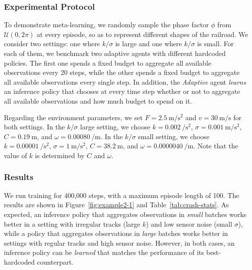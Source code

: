 \subsubsection{Experimental Protocol} To demonstrate meta-learning, we randomly sample the phase factor $\phi$ from $\mathcal{U}(0, 2\pi)$ at every episode, so as to represent different shapes of the railroad. We consider two settings: one where $k/\sigma$ is large and one where $k/\sigma$ is small. For each of them, we benchmark two adaptive agents with different hardcoded policies. The first one spends a fixed budget to aggregate all available observations every 20 steps, while the other spends a fixed budget to aggregate all available observations every single step. In addition, the \emph{Adaptive} agent \emph{learns} an inference policy that chooses at every time step whether or not to aggregate all available observations and how much budget to spend on it.

Regarding the environment parameters, we set $F=\qty{2.5}{\meter\per\second\squared}$ and $v=\qty{30}{\meter\per\second}$ for both settings. In the $k/\sigma$ large setting, we choose $k=\qty{0.002}{\per\second\squared}$, $\sigma=\qty{0.001}{\meter\per\second\squared}$, $C=\qty{0.19}{\meter}$, and $\omega=\qty{0.00080}{\per\meter}$. In the $k/\sigma$ small setting, we choose $k=\qty{0.00001}{\per\second\squared}$, $\sigma=\qty{1}{\meter\per\second\squared}$, $C=\qty{38.2}{\meter}$, and $\omega=\qty{0.0000040}{\per\meter}$. Note that the value of $k$ is determined by $C$ and $\omega$.

\subsubsection{Results} We run training for 400,000 steps, with a maximum episode length of 100. The results are shown in Figure~\ref{fig:example2-1} and Table~\ref{tab:crash-stats}. As expected, an inference policy that aggregates observations in \emph{small} batches works better in a setting with irregular tracks (large $k$) and low sensor noise (small $\sigma$), while a policy that aggregates observations in \emph{large} batches works better in settings with regular tracks and high sensor noise. However, in both cases, an inference policy can be \emph{learned} that matches the performance of its best-hardcoded counterpart.

